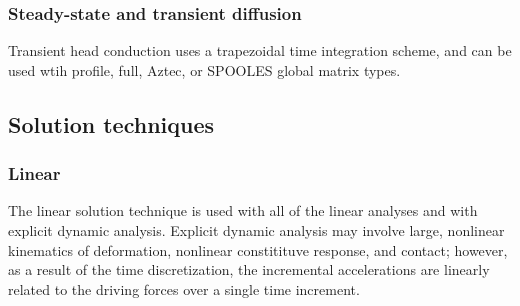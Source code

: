 \subsubsection{Steady-state and transient diffusion}
Transient head conduction uses a trapezoidal time integration scheme, and
can be used wtih profile, full, \textsf{Aztec}, or 
\textsf{SPOOLES}  global
matrix types.

\subsection{Solution techniques}

\subsubsection{Linear}
The linear solution technique is used with all of the linear analyses and
with explicit dynamic analysis.  Explicit dynamic analysis may involve
large, nonlinear kinematics of deformation, nonlinear constitituve
response, and contact; however, as a result of the time discretization, the
incremental accelerations are linearly related to the driving forces over a
single time increment.

